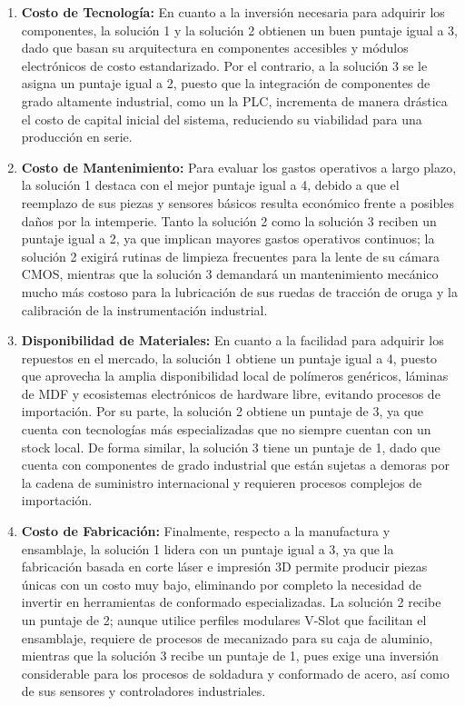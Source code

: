 \begin{enumerate}
	\item \textbf{Costo de Tecnología:} En cuanto a la inversión necesaria para adquirir los componentes, la solución 1 y la solución 2 obtienen un buen puntaje igual a 3, dado que basan su arquitectura en componentes accesibles y módulos electrónicos de costo estandarizado. Por el contrario, a la solución 3 se le asigna un puntaje igual a 2, puesto que la integración de componentes de grado altamente industrial, como un la PLC, incrementa de manera drástica el costo de capital inicial del sistema, reduciendo su viabilidad para una producción en serie.
	
	\item \textbf{Costo de Mantenimiento:} Para evaluar los gastos operativos a largo plazo, la solución 1 destaca con el mejor puntaje igual a 4, debido a que el reemplazo de sus piezas y sensores básicos resulta económico frente a posibles daños por la intemperie. Tanto la solución 2 como la solución 3 reciben un puntaje igual a 2, ya que implican mayores gastos operativos continuos; la solución 2 exigirá rutinas de limpieza frecuentes para la lente de su cámara CMOS, mientras que la solución 3 demandará un mantenimiento mecánico mucho más costoso para la lubricación de sus ruedas de tracción de oruga y la calibración de la instrumentación industrial.
	
	\item \textbf{Disponibilidad de Materiales:} En cuanto a la facilidad para adquirir los repuestos en el mercado, la solución 1 obtiene un puntaje igual a 4, puesto que aprovecha la amplia disponibilidad local de polímeros genéricos, láminas de MDF y ecosistemas electrónicos de hardware libre, evitando procesos de importación. Por su parte, la solución 2 obtiene un puntaje de 3, ya que cuenta con tecnologías más especializadas que no siempre cuentan con un stock local. De forma similar, la solución 3 tiene un puntaje de 1, dado que cuenta con componentes de grado industrial que están sujetas a demoras por la cadena de suministro internacional y requieren procesos complejos de importación.
	
	\item \textbf{Costo de Fabricación:} Finalmente, respecto a la manufactura y ensamblaje, la solución 1 lidera con un puntaje igual a 3, ya que la fabricación basada en corte láser e impresión 3D permite producir piezas únicas con un costo muy bajo, eliminando por completo la necesidad de invertir en herramientas de conformado especializadas. La solución 2 recibe un puntaje de 2; aunque utilice perfiles modulares V-Slot que facilitan el ensamblaje, requiere de procesos de mecanizado para su caja de aluminio, mientras que la solución 3 recibe un puntaje de 1, pues exige una inversión considerable  para los procesos de soldadura y conformado de acero, así como de sus sensores y controladores industriales.
\end{enumerate}

